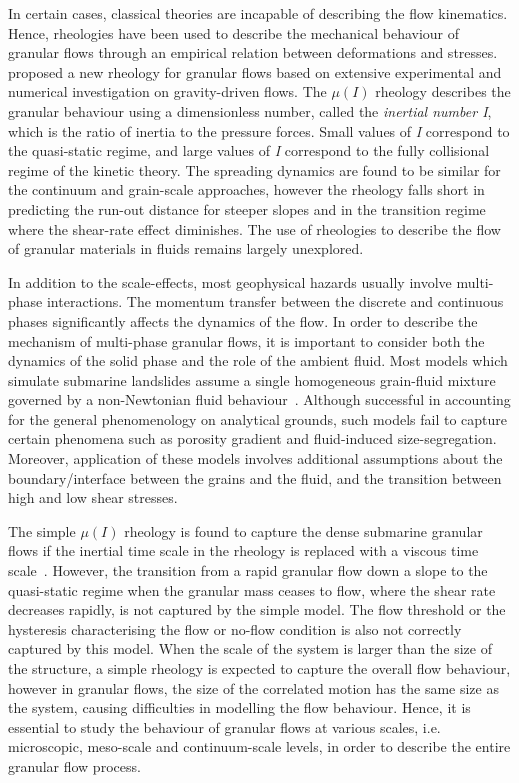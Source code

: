 In certain cases, classical theories are incapable of describing the flow 
kinematics. Hence, rheologies have been used to describe the mechanical 
behaviour of granular flows through an empirical relation between deformations 
and stresses.~\citet{Midi2004} proposed a new rheology for granular flows based 
on extensive experimental and numerical investigation on gravity-driven flows. 
The $\mu(I)$ rheology describes the granular behaviour using a dimensionless 
number, called the \textit{inertial number I}, which is the ratio of inertia to 
the pressure forces. Small values of \textit{I} correspond to the quasi-static 
regime, and large values of \textit{I} correspond to the fully 
collisional regime of the kinetic theory. The spreading dynamics are found to 
be similar for the continuum and grain-scale approaches, however the rheology 
falls short in predicting the run-out distance for steeper slopes and in the 
transition regime where the shear-rate effect diminishes. The use of rheologies 
to describe the flow of granular materials in fluids remains largely 
unexplored.


In addition to the scale-effects, most geophysical hazards usually involve 
multi-phase interactions. The momentum transfer between the discrete and 
continuous phases significantly affects the dynamics of the flow. In order to 
describe the mechanism of multi-phase granular flows, it is important to 
consider both the dynamics of the solid phase and the role of the ambient 
fluid. Most models which simulate submarine landslides assume a single 
homogeneous grain-fluid mixture governed by a non-Newtonian fluid 
behaviour~\citep{Denlinger2001,Iverson2000}. Although successful in accounting 
for the general phenomenology on analytical grounds, such models fail to 
capture certain phenomena such as porosity gradient and fluid-induced 
size-segregation. Moreover, application of these models involves additional 
assumptions about the boundary/interface between the grains and the fluid, and 
the transition between high and low shear stresses. 

The simple $\mu(\textit{I})$ rheology is found to capture the dense submarine 
granular flows if the inertial time scale in the rheology is replaced with a 
viscous time scale~\citep{Pouliquen2005}. However, the transition from a rapid 
granular flow down a slope to the quasi-static regime when the granular mass 
ceases to flow, where the shear rate decreases rapidly, is not captured by the 
simple model. The flow threshold or the hysteresis characterising the flow or 
no-flow condition is also not correctly captured by this model. When the scale 
of the system is larger than the size of the structure, a simple rheology is 
expected to capture the overall flow behaviour, however in granular flows, the 
size of the correlated motion has the same size as the system, causing 
difficulties in modelling the flow behaviour. Hence, it is essential to study 
the behaviour of granular flows at various scales, i.e. microscopic, meso-scale 
and continuum-scale levels, in order to describe the entire granular flow 
process.


